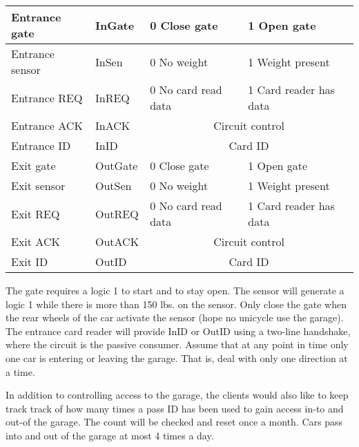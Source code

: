 \begin{enumerate}
        \begin{tabular}{|l|l||l|l|} \hline
            Entrance gate   & InGate  & 0 Close gate                         & 1 Open gate            \\ \hline
            Entrance sensor & InSen   & 0 No weight                          & 1 Weight present       \\ \hline
            Entrance REQ    & InREQ   & 0 No card read data                  & 1 Card reader has data \\ \hline
            Entrance ACK    & InACK   & \multicolumn{2}{c|}{Circuit control}                          \\ \hline
            Entrance ID     & InID    & \multicolumn{2}{c|}{Card ID}                                  \\ \hline
            Exit gate       & OutGate & 0 Close gate                         & 1 Open gate            \\ \hline
            Exit sensor     & OutSen  & 0 No weight                          & 1 Weight present       \\ \hline
            Exit REQ        & OutREQ  & 0 No card read data                  & 1 Card reader has data \\ \hline
            Exit ACK        & OutACK  & \multicolumn{2}{c|}{Circuit control}                          \\ \hline
            Exit ID         & OutID   & \multicolumn{2}{c|}{Card ID}                                  \\ \hline
        \end{tabular}

        The gate requires a logic 1 to start and to stay open. The sensor will
        generate a logic 1 while there is more than 150 lbs. on the sensor.  Only
        close the gate when the rear wheels of the car activate the
        sensor (hope no unicycle use the garage).  The entrance card reader
        will provide InID or OutID using a
        two-line handshake, where the circuit is the passive consumer.
        Assume that at any point in time only one car is
        entering or leaving the garage.  That is, deal with only
        one direction at a time.

        In addition to controlling access to the garage, the clients would also
        like to keep track track of how many times a pass ID has been used to
        gain access in-to and out-of the garage.  The count will be checked and
        reset once a month.  Cars pass into and out of the garage at most 4
        times a day.


\end{enumerate}
